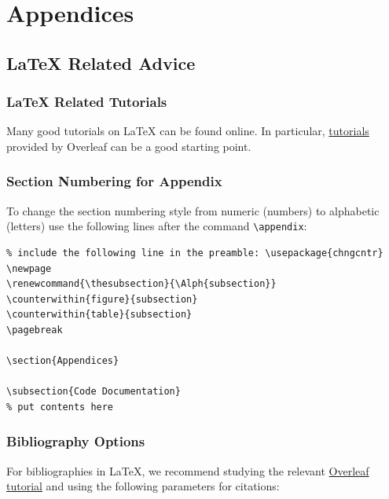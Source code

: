 \newpage

\renewcommand{\thesubsection}{\Alph{subsection}}
\pagebreak
\appendix
\section{Appendices}

\subsection{\LaTeX{} Related Advice}
\label{sec:latex}

\subsubsection{\LaTeX{} Related Tutorials}
Many good tutorials on \LaTeX{} can be found online. In particular, \href{https://www.google.com/search?client=safari&rls=en&q=overleaf+tutorial&ie=UTF-8&oe=UTF-8}{tutorials} provided by Overleaf can be a good starting point.

\subsubsection{Section Numbering for Appendix}
To change the section numbering style from numeric (numbers) to alphabetic (letters) use the following lines after the command \lstinline|\appendix|:

\begin{lstlisting}
% include the following line in the preamble: \usepackage{chngcntr}
\newpage
\renewcommand{\thesubsection}{\Alph{subsection}}
\counterwithin{figure}{subsection}
\counterwithin{table}{subsection}
\pagebreak  

\section{Appendices}

\subsection{Code Documentation}
% put contents here
\end{lstlisting}



\subsubsection{Bibliography Options}
For bibliographies in \LaTeX{}, we recommend studying the relevant \href{https://de.overleaf.com/learn/latex/Bibliography_management_with_biblatex}{Overleaf tutorial} and using the following parameters for citations:

